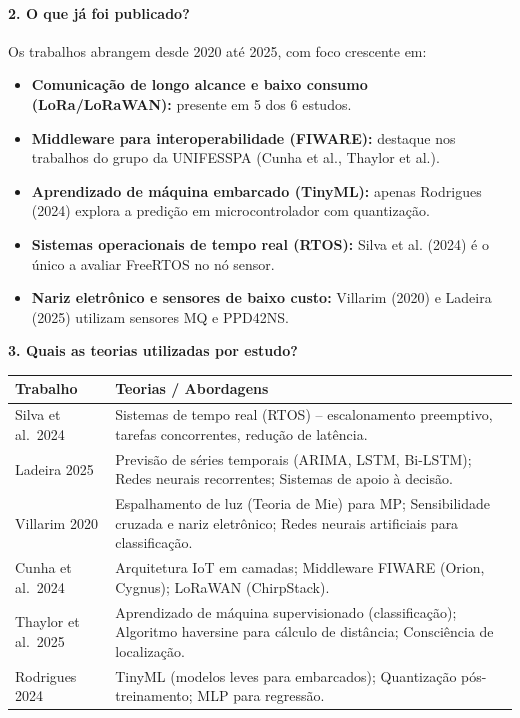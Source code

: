 \paragraph*{2. O que já foi publicado?}

Os trabalhos abrangem desde 2020 até 2025, com foco crescente em:

\begin{itemize}[leftmargin=*]
  \item \textbf{Comunicação de longo alcance e baixo consumo (LoRa/LoRaWAN):} presente em 5 dos 6 estudos.
  \item \textbf{Middleware para interoperabilidade (FIWARE):} destaque nos trabalhos do grupo da UNIFESSPA (Cunha et al., Thaylor et al.).
  \item \textbf{Aprendizado de máquina embarcado (TinyML):} apenas Rodrigues (2024) explora a predição em microcontrolador com quantização.
  \item \textbf{Sistemas operacionais de tempo real (RTOS):} Silva et al. (2024) é o único a avaliar FreeRTOS no nó sensor.
  \item \textbf{Nariz eletrônico e sensores de baixo custo:} Villarim (2020) e Ladeira (2025) utilizam sensores MQ e PPD42NS.
\end{itemize}

\par\noindent\textbf{3. Quais as teorias utilizadas por estudo?}\par

\begin{table}[H]
\centering
\small
\begin{tabularx}{\textwidth}{|p{3.5cm}|X|}
\hline
\textbf{Trabalho} & \textbf{Teorias / Abordagens} \\
\hline
Silva et al.\ 2024 & Sistemas de tempo real (RTOS) – escalonamento preemptivo, tarefas concorrentes, redução de latência. \\
\hline
Ladeira 2025 & Previsão de séries temporais (ARIMA, LSTM, Bi-LSTM); Redes neurais recorrentes; Sistemas de apoio à decisão. \\
\hline
Villarim 2020 & Espalhamento de luz (Teoria de Mie) para MP; Sensibilidade cruzada e nariz eletrônico; Redes neurais artificiais para classificação. \\
\hline
Cunha et al.\ 2024 & Arquitetura IoT em camadas; Middleware FIWARE (Orion, Cygnus); LoRaWAN (ChirpStack). \\
\hline
Thaylor et al.\ 2025 & Aprendizado de máquina supervisionado (classificação); Algoritmo haversine para cálculo de distância; Consciência de localização. \\
\hline
Rodrigues 2024 & TinyML (modelos leves para embarcados); Quantização pós-treinamento; MLP para regressão. \\
\hline
\end{tabularx}
\end{table}

